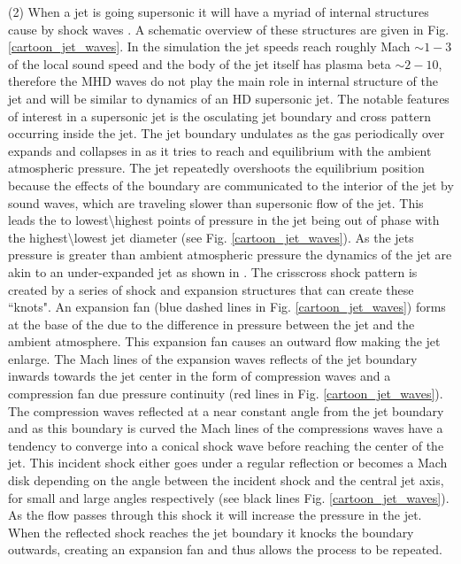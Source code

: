 \par (2) When a jet is going supersonic it will have a myriad of internal structures cause by shock waves \citep{Norman1982}. A schematic overview of these structures are given in Fig. \eqref{cartoon_jet_waves}. In the simulation the jet speeds reach roughly Mach $\sim 1-3$ of the local sound speed and the body of the jet itself has plasma beta $\sim 2-10$, therefore the MHD waves do not play the main role in internal structure of the jet and will be similar to dynamics of an HD supersonic jet. The notable features of interest in a supersonic jet is the osculating jet boundary and cross pattern occurring inside the jet. The jet boundary undulates as the gas periodically over expands and collapses in as it tries to reach and equilibrium with the ambient atmospheric pressure. The jet repeatedly overshoots the equilibrium position because the effects of the boundary are communicated to the interior of the jet by sound waves, which are traveling slower than supersonic flow of the jet. This leads the to lowest\textbackslash highest points of pressure in the jet being out of phase with the highest\textbackslash lowest jet diameter (see Fig. \eqref{cartoon_jet_waves}). As the jets pressure is greater than ambient atmospheric pressure the dynamics of the jet are akin to an under-expanded jet as shown in \cite{Norman1982,Edgington-Mitchell2014}. The crisscross shock pattern is created by a series of shock and expansion structures that can create these ``knots". An expansion fan (blue dashed lines in Fig. \eqref{cartoon_jet_waves}) forms at the base of the due to the difference in pressure between the jet and the ambient atmosphere. This expansion fan causes an outward flow making the jet enlarge. The Mach lines of the expansion waves reflects of the jet boundary inwards towards the jet center in the form of compression waves and a compression fan due pressure continuity (red lines in Fig. \eqref{cartoon_jet_waves}). The compression waves reflected at a near constant angle from the jet boundary and as this boundary is curved the Mach lines of the compressions waves have a tendency to converge into a conical shock wave before reaching the center of the jet. This incident shock either goes under a regular reflection or becomes a Mach disk depending on the angle between the incident shock and the central jet axis, for small and large angles respectively (see black lines Fig. \eqref{cartoon_jet_waves}). As the flow passes through this shock it will increase the pressure in the jet. When the reflected shock reaches the jet boundary it knocks the boundary outwards, creating an expansion fan and thus allows the process to be repeated.
